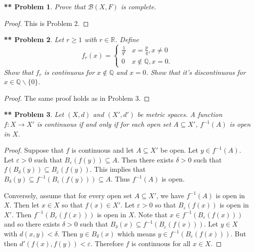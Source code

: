 \documentclass{article}
\newtheorem{**}{** Problem}
\begin{document}
\begin{flushleft}
\begin{**}
Prove that $\mathcal{B} (X, F)$ is complete.
\end{**}
\begin{proof}
This is Problem 2.
\end{proof}

\begin{**}
Let $r \geq 1$ with $r \in \mathbb{R}$. Define
\[
f_r (x)= 
\begin{cases}
\frac{1}{q^r} & x = \frac{p}{q}, x \neq 0\\
0 & x \notin \mathbb{Q}, x = 0.
\end{cases}
\]
Show that $f_r$ is continuous for $x \notin \mathbb{Q}$ and $x = 0$. Show that it's discontinuous for $x \in \mathbb{Q} \backslash \{0\}$.
\end{**}
\begin{proof}
The same proof holds as in Problem 3.
\end{proof}

\begin{**}
Let $(X, d)$ and $(X', d')$ be metric spaces. A function $f : X \rightarrow X'$ is continuous if and only if for each open set $A \subseteq X'$, $f^{-1}(A)$ is open in $X$.
\end{**}
\begin{proof}
Suppose that $f$ is continuous and let $A \subseteq X'$ be open. Let $y \in f^{-1}(A)$. Let $\varepsilon > 0$ such that $B_{\varepsilon}(f(y)) \subseteq A$. Then there exists $\delta > 0$ such that $f(B_{\delta}(y)) \subseteq B_{\varepsilon}(f(y))$. This implies that $B_{\delta}(y) \subseteq f^{-1}(B_{\varepsilon}(f(y))) \subseteq A$. Thus $f^{-1}(A)$ is open.\newline

Conversely, assume that for every open set $A \subseteq X'$, we have $f^{-1}(A)$ is open in $X$. Then let $x \in X$ so that $f(x) \in X'$. Let $\varepsilon > 0$ so that $B_{\varepsilon}(f(x))$ is open in $X'$. Then $f^{-1}(B_{\varepsilon}(f(x)))$ is open in $X$. Note that $x \in f^{-1}(B_{\varepsilon}(f(x)))$ and so there exists $\delta > 0$ such that $B_{\delta}(x) \subseteq f^{-1}(B_{\varepsilon}(f(x)))$. Let $y \in X$ with $d(x,y) < \delta$. Then $y \in B_{\delta}(x)$ which means $y \in f^{-1}(B_{\varepsilon}(f(x)))$. But then $d'(f(x), f(y)) < \varepsilon$. Therefore $f$ is continuous for all $x \in X$.
\end{proof}


\end{flushleft}
\end{document}
